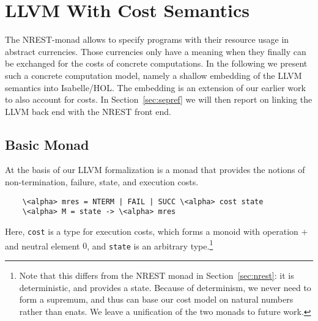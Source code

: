 \documentclass[acmsmall]{acmart}
\newcommand{\is}{\lstinline[language=isabelle]}
\begin{document}










\section{LLVM With Cost Semantics} \label{sec:llvm}

The NREST-monad allows to specify programs with their resource usage in abstract currencies. 
Those currencies only have a meaning when they finally can be exchanged for the costs of concrete computations.
In the following we present such a concrete computation model, namely a shallow embedding of the LLVM semantics into Isabelle/HOL. 
The embedding is an extension of our earlier work~\cite{lammich2019LLVM} to also 
account for costs. In Section~\ref{sec:sepref} we will then report on linking the LLVM back end with the NREST front end.







\subsection{Basic Monad} 

At the basis of our LLVM formalization is a monad that provides the notions of
non-termination, failure, state, and execution costs.
\begin{lstlisting}
    \<alpha> mres = NTERM | FAIL | SUCC \<alpha> cost state
    \<alpha> M = state -> \<alpha> mres
\end{lstlisting}
Here, \is{cost} is a type for execution costs, which forms a
monoid with operation $+$ and neutral element $0$,
and \is{state} is an arbitrary type.\footnote{Note that this differs from the NREST monad in Section~\ref{sec:nrest}: it is deterministic, and provides a state. Because of determinism, we never need to form a supremum, and thus can base our cost model on natural numbers rather than enats. We leave a unification of the two monads to future work.}
\end{document}
